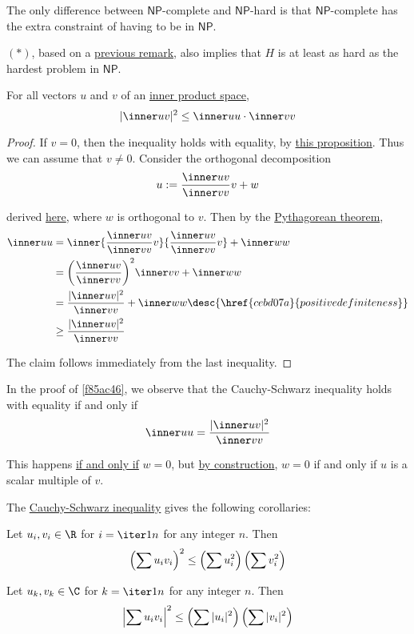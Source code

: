 The only difference between $\mathsf{NP}$-complete and $\mathsf{NP}$-hard is
that $\mathsf{NP}$-complete has the extra constraint of having to be in
$\mathsf{NP}$.

$(*)$, based on a \href{e04bcbc}{previous remark}, also implies that
$H$ is at least as hard as the hardest problem in $\mathsf{NP}$.

\label{f85ac46}

For all vectors $u$ and $v$ of an \href{b9935c8}{inner product space},
$$
  |\inner uv|^2\leq\inner uu\cdot\inner vv
$$

\begin{proof}
  If $v=0$, then the inequality holds with equality, by \href{fb218c8}{this
  proposition}. Thus we can assume that $v\neq0$. Consider the orthogonal
  decomposition
  $$
    u:=\frac{\inner uv}{\inner vv}v+w
  $$

  derived \href{a7dfcb8}{here}, where $w$ is orthogonal to $v$. Then by the
  \href{c5e5d7d}{Pythagorean theorem},
  \begin{align*}
    \inner uu &=\inner{\frac{\inner uv}{\inner vv}v}{\frac{\inner uv}{\inner vv}v}+\inner ww          \\
              &=\biggl(\frac{\inner uv}{\inner vv}\biggr)^2\inner vv+\inner ww                        \\
              &=\frac{|\inner uv|^2}{\inner vv}+\inner ww\desc{\href{cebd07a}{positive definiteness}} \\
              &\geq\frac{|\inner uv|^2}{\inner vv}
  \end{align*}

  The claim follows immediately from the last inequality.
\end{proof}

\label{f012e25}

In the proof of \autoref{f85ac46}, we observe that the Cauchy-Schwarz
inequality holds with equality if and only if
$$
  \inner uu=\frac{|\inner uv|^2}{\inner vv}
$$

This happens \href{fb218c8}{if and only if} $w=0$, but \href{a7dfcb8}{by
construction}, $w=0$ if and only if $u$ is a scalar multiple of $v$.

\label{c503127}

The \href{c503127}{Cauchy-Schwarz inequality} gives the following corollaries:
\begin{enumerata}
  \item Let $u_i,v_i\in\R$ for $i=\iter1n$ for any integer $n$. Then
  \begin{equation*}
    \def\su{\sum}\def\u{u_i}\def\v{v_i}
    \left(\su\u\v\right)^2\leq\left(\su\u^2\right)\left(\su\v^2\right)
  \end{equation*}

  \item Let $u_k,v_k\in\C$ for $k=\iter1n$ for any integer $n$. Then
  \begin{equation*}
    \def\su{\sum}\def\u{u_i}\def\v{v_i}
    \left|\su\u\v\right|^2\leq\left(\su|\u|^2\right)\left(\su|\v|^2\right)
  \end{equation*}
\end{enumerata}

